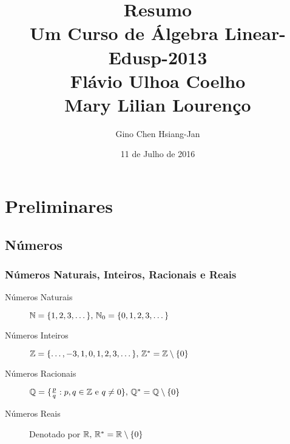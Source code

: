 \documentclass[10pt,a4paper]{book}
\author{Gino Chen Hsiang-Jan}
\title{Resumo\\Um Curso de Álgebra Linear-Edusp-2013\\Flávio Ulhoa Coelho\\Mary Lilian Lourenço}
\date{11 de Julho de 2016}
\begin{document}
\maketitle
\tableofcontents

\newpage


\chapter{Preliminares}




\section{Números}
\subsection{Números Naturais, Inteiros, Racionais e Reais}

\begin{description}
	\item[Números Naturais ] $\mathbb{ N } = \{ 1, 2, 3, \dots \}, \, \mathbb{ N }_0 = \{ 0, 1, 2, 3, \dots \}$
	\item[Números Inteiros ] $\mathbb{ Z } = \{ \dots, -3, 1, 0, 1, 2, 3, \dots \}, \, \mathbb{ Z }^* = \mathbb{ Z } \setminus \{ 0 \}$
	\item[Números Racionais] $\mathbb{ Q } = \{ \frac{p}{q} :p, q \in \mathbb{ Z } \text{ e } q \neq 0 \}, \, \mathbb{ Q }^* = \mathbb{ Q } \setminus \{ 0 \}$
	\item[Números Reais    ] Denotado por $\mathbb{ R }, \, \mathbb{ R }^* = \mathbb{ R } \setminus \{ 0 \}$
\end{description}
\end{document}
